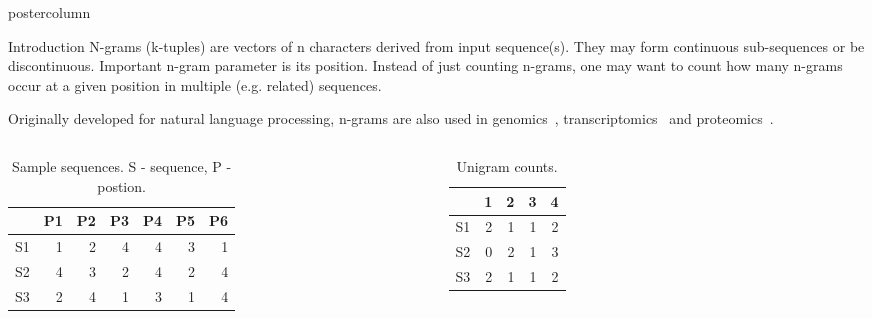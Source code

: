 \documentclass[final]{beamer}\usepackage[]{graphicx}\usepackage[]{color}
\newlength{\columnheight}
\begin{document}
\begin{frame}
  \begin{columns}
    \begin{column}{.47\textwidth}
      \begin{beamercolorbox}[center,wd=\textwidth]{postercolumn}
        \begin{minipage}[T]{.95\textwidth}
          \parbox[t][\columnheight]{\textwidth}
            {
    
        
    \begin{block}{Introduction}
N-grams (k-tuples) are vectors of n characters derived from input sequence(s). They may form continuous sub-sequences or be discontinuous. 
Important n-gram parameter is its position. Instead of just counting n-grams, one may want to count how many n-grams occur at a given position in multiple (e.g. related) sequences.

Originally developed for natural language processing, n-grams are also used in genomics~\citep{fang2011}, transcriptomics~\citep{wang2014} and proteomics~\citep{guo2014}.

\small{
       \begin{columns}[c] %
\begin{table}[ht]
\centering
\begin{tabular}{rrrrrrr}
  \hline
 & P1 & P2 & P3 & P4 & P5 & P6 \\ 
  \hline
S1 & 1 & 2 & 4 & 4 & 3 & 1 \\ 
  S2 & 4 & 3 & 2 & 4 & 2 & 4 \\ 
  S3 & 2 & 4 & 1 & 3 & 1 & 4 \\ 
   \hline
\end{tabular}
\caption{Sample sequences.  S - sequence, P - postion.} 
\end{table}

      
      

    
\begin{table}[ht]
\centering
\begin{tabular}{rrrrr}
  \hline
 & 1 & 2 & 3 & 4 \\ 
  \hline
S1 & 2 & 1 & 1 & 2 \\ 
  S2 & 0 & 2 & 1 & 3 \\ 
  S3 & 2 & 1 & 1 & 2 \\ 
   \hline
\end{tabular}
\caption{Unigram counts.} 
\end{table}



\end{columns}}
\end{block}}
\end{minipage}
\end{beamercolorbox}
\end{column}
\end{columns}
\end{frame}
\end{document}
